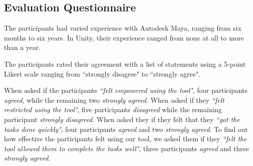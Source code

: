 \subsection{Evaluation Questionnaire}
The participants had varied experience with Autodesk Maya, ranging from six months to six years. In Unity, their experience ranged from none at all to more than a year.

The participants rated their agreement with a list of statements using a 5-point Likert scale ranging from ``strongly disagree" to ``strongly agree". 


When asked if the participants \textit{``felt empowered using the tool"}, four participants \textit{agreed}, while the remaining two \textit{strongly agreed}. When asked if they \textit{``felt restricted using the tool"}, five participants \textit{disagreed} while the remaining participant \textit{strongly disagreed}. When asked they if they felt that they \textit{``got the tasks done quickly"}, four participants \textit{agreed} and two \textit{strongly agreed}. To find out how effective the participants felt using our tool, we asked them if they \textit{``felt the tool allowed them to complete the tasks well"}, three participants \textit{agreed} and three \textit{strongly agreed}.


